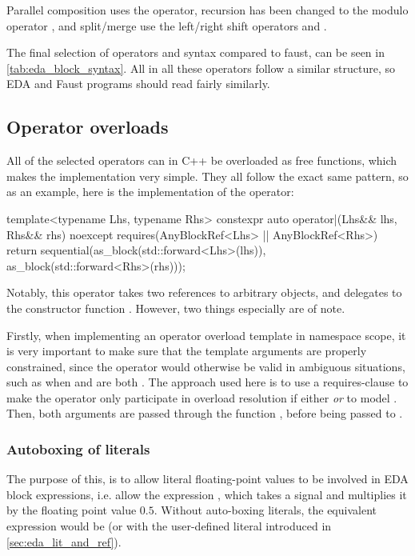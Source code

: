 Parallel composition uses the \oper{,} operator, recursion has been changed to the modulo
operator  \oper{\%}, and split/merge use the left/right shift operators \oper{<<}
and \oper{>>}.

The final selection of operators and syntax compared to faust, can be seen in \autoref{tab:eda_block_syntax}. All in
all these operators follow a similar structure, so EDA and Faust programs should read fairly similarly.

\subsection{Operator overloads}

All of the selected operators can in C++ be overloaded as free functions, which makes the implementation very
simple. They all follow the exact same pattern, so as an example, here is the implementation of the
\oper{|} operator:

\begin{cppcodenl}
  template<typename Lhs, typename Rhs>
  constexpr auto operator|(Lhs&& lhs, Rhs&& rhs) noexcept
  requires(AnyBlockRef<Lhs> || AnyBlockRef<Rhs>)
  {
    return sequential(as_block(std::forward<Lhs>(lhs)), as_block(std::forward<Rhs>(rhs)));
  }
\end{cppcodenl}

Notably, this operator takes two references to arbitrary objects, and delegates to the constructor function
. However, two things especially are of note.

Firstly, when implementing an operator overload template in namespace scope, it is very important to make
sure that the template arguments are properly constrained, since the operator would otherwise be valid in
ambiguous situations, such as when  and  are both . The approach
used here is to use a requires-clause to make the operator only participate in overload resolution if either
 \emph{or}  to model . Then, both arguments are passed through the
function
, before being passed to .

\subsubsection{Autoboxing of literals}

The purpose of this, is to allow literal floating-point values to be involved in EDA block expressions, i.e.
allow the expression , which takes a signal and multiplies it by the floating point
value $0.5$. Without auto-boxing literals, the equivalent expression would be
 (or  with the user-defined literal introduced in \autoref{sec:eda_lit_and_ref}).

